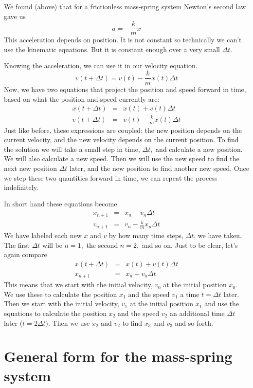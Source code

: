 \documentclass[twoside,11pt,ShortChapTitles]{BYUTextbook}
\begin{document}
We found (above) that for a frictionless mass-spring system Newton's second
law gave us 
\[
a=-\frac{k}{m}x 
\]%
This acceleration depends on position. It is not constant so technically we
can't use the kinematic equations. But it is constant enough over a very
small $\Delta t.$

Knowing the acceleration, we can use it in our velocity equation. 
\[
v(t+\Delta t)=v(t)-\frac{k}{m}x(t)\Delta t 
\]%
Now, we have two equations that project the position and speed forward in
time, based on what the position and speed currently are: 
\begin{eqnarray*}
x(t+\Delta t) &=&x(t)+v(t)\Delta t \\
v(t+\Delta t) &=&v(t)-\frac{k}{m}x(t)\Delta t
\end{eqnarray*}%
Just like before, these expressions are coupled: the new position depends on
the current velocity, and the new velocity depends on the current position.
To find the solution we will take a small step in time, $\Delta t,$ and
calculate a new position. We will also calculate a new speed. Then we will
use the new speed to find the next new position $\Delta t$ later, and the
new position to find another new speed. Once we step these two quantities
forward in time, we can repeat the process indefinitely.

In short hand these equations become%
\begin{eqnarray*}
x_{n+1} &=&x_{n}+v_{n}\Delta t \\
v_{n+1} &=&v_{n}-\frac{k}{m}x_{n}\Delta t
\end{eqnarray*}%
We have labeled each new $x$ and $v$ by how many time steps, $\Delta t$, we
have taken. The first $\Delta t$ will be $n=1,$ the second $n=2,$ and so on.
Just to be clear, let's again compare%
\begin{eqnarray*}
x(t+\Delta t) &=&x(t)+v(t)\Delta t \\
x_{n+1} &=&x_{n}+v_{n}\Delta t
\end{eqnarray*}%
This means that we start with the initial velocity, $v_{0}$ at the initial
position $x_{0}.$ We use these to calculate the position $x_{1}$ and the
speed $v_{1}$ a time $t=\Delta t$ later. Then we start with the initial
velocity, $v_{1}$ at the initial position $x_{1}$ and use the equations to
calculate the position $x_{2}$ and the speed $v_{2}$ an additional time $%
\Delta t$ later ($t=2\Delta t$). Then we use $x_{2}$ and $v_{2}$ to find $%
x_{3}$ and $v_{3}$ and so forth.

\section{General form for the mass-spring system}
\end{document}
